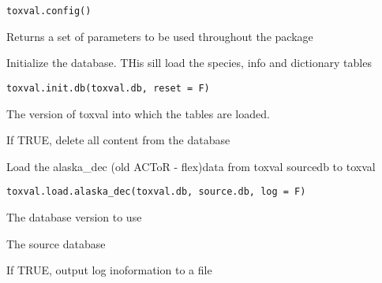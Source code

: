 \documentclass[letterpaper]{book}
\begin{document}
%
\begin{Usage}
\begin{verbatim}
toxval.config()
\end{verbatim}
\end{Usage}
%
\begin{Value}
Returns a set of parameters to be used throughout the package
\end{Value}
%
\begin{Description}\relax
Initialize the database. THis sill load the species, info and dictionary tables
\end{Description}
%
\begin{Usage}
\begin{verbatim}
toxval.init.db(toxval.db, reset = F)
\end{verbatim}
\end{Usage}
%
\begin{Arguments}
\begin{ldescription}
\item[\code{toxval.db}] The version of toxval into which the tables are loaded.

\item[\code{reset}] If TRUE, delete all content from the database
\end{ldescription}
\end{Arguments}
%
\begin{Description}\relax
Load the alaska\_dec (old ACToR - flex)data  from toxval sourcedb to toxval
\end{Description}
%
\begin{Usage}
\begin{verbatim}
toxval.load.alaska_dec(toxval.db, source.db, log = F)
\end{verbatim}
\end{Usage}
%
\begin{Arguments}
\begin{ldescription}
\item[\code{toxval.db}] The database version to use

\item[\code{source.db}] The source database

\item[\code{log}] If TRUE, output log inoformation to a file
\end{ldescription}
\end{Arguments}
\end{document}

